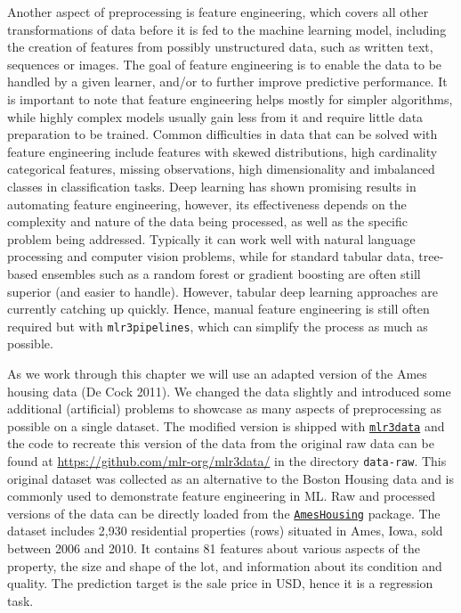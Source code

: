 Another aspect of preprocessing is feature
engineering, which covers all other transformations
of data before it is fed to the machine learning model, including the
creation of features from possibly unstructured data, such as written
text, sequences or images. The goal of feature engineering is to enable
the data to be handled by a given learner, and/or to further improve
predictive performance. It is important to note that feature engineering
helps mostly for simpler algorithms, while highly complex models usually
gain less from it and require little data preparation to be trained.
Common difficulties in data that can be solved with feature engineering
include features with skewed distributions, high cardinality categorical
features, missing observations, high dimensionality and imbalanced
classes in classification tasks. Deep learning has shown promising
results in automating feature engineering, however, its effectiveness
depends on the complexity and nature of the data being processed, as
well as the specific problem being addressed. Typically it can work well
with natural language processing and computer vision problems, while for
standard tabular data, tree-based ensembles such as a random forest or
gradient boosting are often still superior (and easier to handle).
However, tabular deep learning approaches are currently catching up
quickly. Hence, manual feature engineering is still often required but
with \texttt{mlr3pipelines}, which can simplify the process as much as
possible.

As we work through this chapter we will use an adapted version of the
Ames housing data (De Cock 2011). We changed the data slightly and
introduced some additional (artificial) problems to showcase as many
aspects of preprocessing as possible on a single dataset. The modified
version is shipped with
\href{https://mlr3data.mlr-org.com}{\texttt{mlr3data}} and the code to
recreate this version of the data from the original raw data can be
found at \url{https://github.com/mlr-org/mlr3data/} in the directory
\texttt{data-raw}. This original dataset was collected as an alternative
to the Boston Housing data and is commonly used to demonstrate feature
engineering in ML. Raw and processed versions of the data can be
directly loaded from the
\href{https://cran.r-project.org/package=AmesHousing}{\texttt{AmesHousing}}
package. The dataset includes 2,930 residential properties (rows)
situated in Ames, Iowa, sold between 2006 and 2010. It contains 81
features about various aspects of the property, the size and shape of
the lot, and information about its condition and quality. The prediction
target is the sale price in USD, hence it is a regression task.

